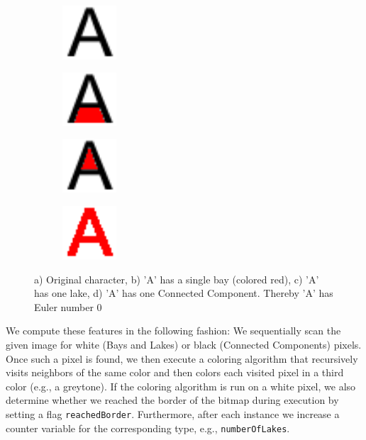 \documentclass{article}
\begin{document}
\begin{figure}
 \centering
 \begin{subfigure}[]
  \centering
  \includegraphics[height=2cm]{images/A_original.png}
  \label{fig:original}
 \end{subfigure}
%
 \begin{subfigure}[]
  \centering
  \includegraphics[height=2cm]{images/A_bay.png}
  \label{fig:bays}
 \end{subfigure}

 \begin{subfigure}[]
  \centering
  \includegraphics[height=2cm]{images/A_lake.png}
  \label{fig:lakes}
 \end{subfigure}
%
 \begin{subfigure}[]
  \centering
  \includegraphics[height=2cm]{images/A_component.png}
  \label{fig:ccomp}
 \end{subfigure}
 \caption{a) Original character, b) 'A' has a single bay (colored red), c) 'A' has one lake, d) 'A' has one Connected Component. Thereby 'A' has Euler number 0 }
 \label{fig:bayslakescomp}
\end{figure}

We compute these features in the following fashion: We sequentially scan the given image for white (Bays and Lakes) or black (Connected Components) pixels. Once such a pixel is found, we then execute a coloring algorithm that recursively visits neighbors of the same color and then colors each visited pixel in a third color (e.g., a greytone). If the coloring algorithm is run on a white pixel, we also determine whether we reached the border of the bitmap during execution by setting a flag \texttt{reachedBorder}. Furthermore, after each instance we increase a counter variable for the corresponding type, e.g., \texttt{numberOfLakes}.
\end{document}
